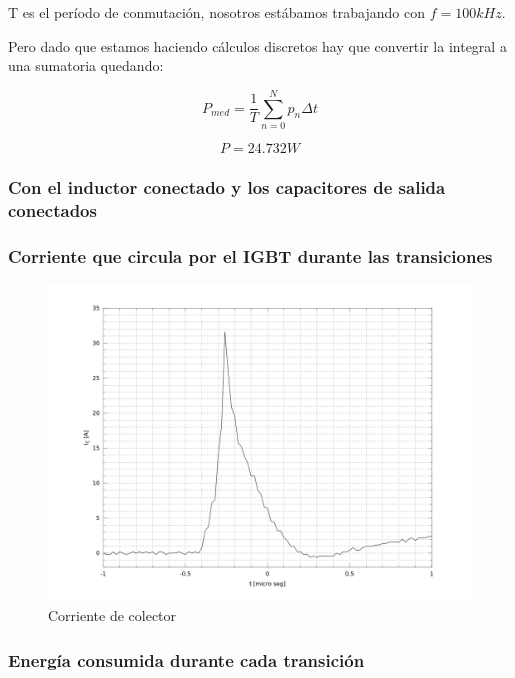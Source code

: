 \documentclass[a4paper,10pt]{article}
\begin{document}
T es el período de conmutación, nosotros estábamos trabajando con $f =
100 \unit{kHz}$.

Pero dado que estamos haciendo cálculos discretos hay que convertir la
integral a una sumatoria quedando:

\begin{equation}
P_{med} = \frac{1}{T} \sum_{n=0}^N p_n \Delta t
\end{equation}

\begin{equation}
	P = 24.732 \unit{W}
\end{equation}

\subsubsection{Con el inductor conectado y los capacitores de salida conectados}

\subsubsection*{Corriente que circula por el IGBT durante las transiciones}

\begin{figure}[H] %
\begin{center}
\includegraphics[scale=0.3]{./imagenes/Ic2.png}
\caption{Corriente de colector}
 \label{fig:Ic2}
\end{center}
\end{figure}

\subsubsection*{Energía consumida durante cada transición}
\end{document}
